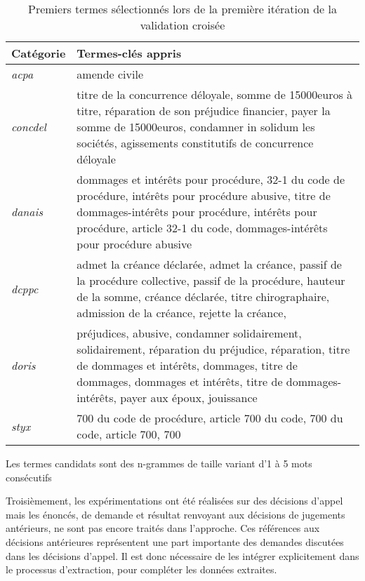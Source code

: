 \begin{table}[!htb]
		\centering\scriptsize
	\begin{tabular}{|l|p{}|}
		\hline
		\textbf{Catégorie} & \textbf{Termes-clés appris} \\ \hline
		\textit{acpa}    & amende civile                                                                                                                                                                                                                               \\ \hline
		\textit{concdel} & titre de la concurrence déloyale, somme de 15000euros à titre, réparation de son préjudice financier, payer la somme de 15000euros, condamner in solidum les sociétés, agissements constitutifs de concurrence déloyale                   \\ \hline
		\textit{danais}  & dommages et intérêts pour procédure, 32-1 du code de procédure, intérêts pour procédure abusive, titre de dommages-intérêts pour procédure, intérêts pour procédure, article 32-1 du code, dommages-intérêts pour procédure abusive         \\ \hline
		\textit{dcppc}   & admet la créance déclarée, admet la créance, passif de la procédure collective, passif de la procédure, hauteur de la somme, créance déclarée, titre chirographaire, admission de la créance, rejette la créance,                           \\ \hline
		\textit{doris}   & préjudices, abusive, condamner solidairement, solidairement, réparation du préjudice, réparation, titre de dommages et intérêts, dommages, titre de dommages, dommages et intérêts, titre de dommages-intérêts, payer aux époux, jouissance \\ \hline
		\textit{styx}    & 700 du code de procédure, article 700 du code, 700 du code, article 700, 700                                                                                                                                                                \\ \hline
	\end{tabular}
Les termes candidats sont des n-grammes de taille variant d'1 à 5 mots consécutifs
\caption{Premiers termes sélectionnés lors de la première itération de la validation croisée} \label{tab:quanta:exemples_termes}
\end{table}

Troisièmement, les expérimentations ont été réalisées sur des décisions d'appel mais les énoncés, de demande et résultat renvoyant aux décisions de jugements antérieurs, ne sont pas encore traités dans l'approche. Ces références aux décisions antérieures représentent une part importante des demandes discutées dans les décisions d'appel. Il est donc nécessaire de les intégrer explicitement dans le processus d'extraction, pour compléter les données extraites.

